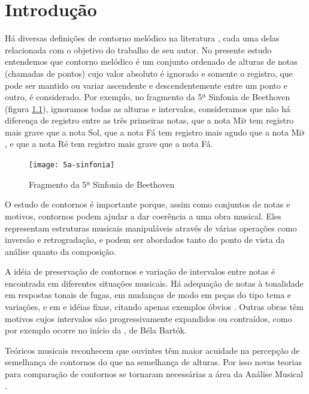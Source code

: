 \chapter{Introdução}
\label{cha:introducao}

Há diversas definições de contorno melódico na literatura
\cite{piston59:harmony,toch77:shaping,schonberg:fundamentals,adams76:melodic,marvin.ea87:relating,morris87:composition,clifford95:contour,beard03:contour},
cada uma delas relacionada com o objetivo do trabalho de seu autor.
No presente estudo entendemos que contorno melódico é um conjunto
ordenado de alturas de notas (chamadas de pontos) cujo valor absoluto
é ignorado e somente o registro, que pode ser mantido ou variar
ascendente e descendentemente entre um ponto e outro, é
considerado. Por exemplo, no fragmento da 5ª Sinfonia de Beethoven
(figura \ref{fig:5a-sinfonia}), ignoramos todas as alturas e
intervalos, consideramos que não há diferença de registro entre as
três primeiras notas, que a nota Mi$\flat$ tem registro mais grave que
a nota Sol, que a nota Fá tem registro mais agudo que a nota
Mi$\flat$, e que a nota Ré tem registro mais grave que a nota Fá.

\begin{figure}
  \centering
  \texttt{[image: 5a-sinfonia]}
  \caption{Fragmento da 5ª Sinfonia de Beethoven}
  \label{fig:5a-sinfonia}
\end{figure}

O estudo de contornos é importante porque, assim como conjuntos de
notas e motivos, contornos podem ajudar a dar coerência a uma obra
musical. Eles representam estruturas musicais manipuláveis através de
várias operações como inversão e retrogradação, e podem ser abordados
tanto do ponto de vista da análise quanto da composição.

A idéia de preservação de contornos e variação de intervalos entre
notas é encontrada em diferentes situações musicais. Há adequação de
notas à tonalidade em respostas tonais de fugas, em mudanças de modo
em peças do tipo tema e variações, e em  e idéias
fixas, citando apenas exemplos óbvios
\cite[p. 29]{morris87:composition}. Outras obras têm motivos cujos
intervalos são progressivamente expandidos ou contraídos, como por
exemplo ocorre no início da , de Béla Bartók.

Teóricos musicais reconhecem que ouvintes têm maior acuidade na
percepção de semelhança de contornos do que na semelhança de
alturas. Por isso novas teorias para comparação de contornos se
tornaram necessárias a área da Análise Musical
\cite[p. 226]{marvin.ea87:relating}.

